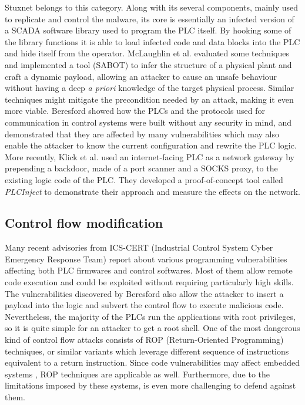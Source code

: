 Stuxnet \cite{stuxnet} belongs to this category. Along with its several components, mainly used to replicate and control the malware,
its core is essentially an infected version of a SCADA software library used to program the PLC itself.
By hooking some of the library functions it is able to load infected code and data blocks into the PLC and hide itself from the operator.
McLaughlin et al. \cite{dynamic-payload,sabot} evaluated some techniques and implemented a tool (SABOT) to infer the structure of a physical plant and craft a dynamic payload,
allowing an attacker to cause an unsafe behaviour without having a deep \emph{a priori} knowledge of the target physical process.
Similar techniques might mitigate the precondition needed by an attack, making it even more viable.
Beresford \cite{siemens-s7} showed how the PLCs and the protocols used for communication in control systems were built without any security in mind,
and demonstrated that they are affected by many vulnerabilities which may also enable the attacker to know the current configuration and rewrite the PLC logic.
More recently, Klick et al. \cite{plc-network} used an internet-facing PLC as a network gateway by prepending a backdoor, made of a port scanner and a SOCKS proxy,
to the existing logic code of the PLC. They developed a proof-of-concept tool called \emph{PLCInject} to demonstrate their approach and measure the effects on the network.


\subsection{Control flow modification}

Many recent advisories \cite{abb-codesys,codesys-server,schneider-bof,rockwell-vuln,rockwell-vuln2,elcsoft-vuln} from ICS-CERT (Industrial Control System Cyber Emergency Response Team)
report about various programming vulnerabilities affecting both PLC firmwares and control softwares. Most of them allow remote code execution and could be exploited
without requiring particularly high skills.
The vulnerabilities discovered by Beresford \cite{siemens-s7} also allow the attacker to insert a payload into the logic and subvert the control flow to execute
malicious code. Nevertheless, the majority of the PLCs run the applications with root privileges, so it is quite simple for an attacker to get a root shell.
One of the most dangerous kind of control flow attacks consists of ROP (Return-Oriented Programming) techniques, or similar variants \cite{jop,no-ret}
which leverage different sequence of instructions equivalent to a return instruction.
Since code vulnerabilities may affect embedded systems \cite{schneider-bof,rockwell-vuln,rockwell-vuln2,elcsoft-vuln,siemens-s7}, ROP techniques
are applicable as well. Furthermore, due to the limitations imposed by these systems, is even more challenging to defend against them.


